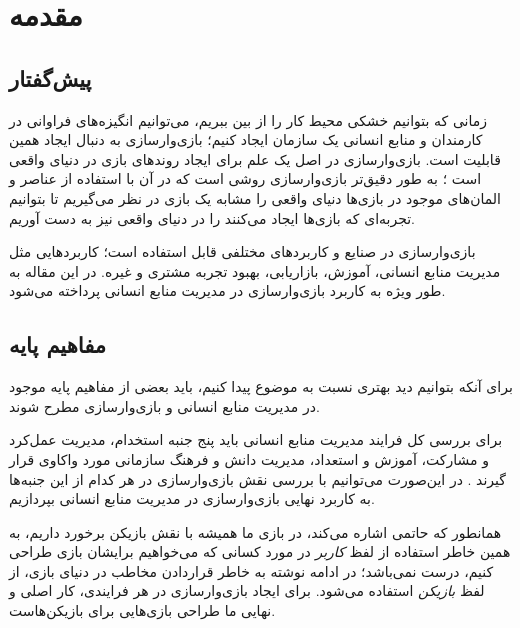 \chapter{مقدمه}
\section{پیش‌گفتار}
زمانی که بتوانیم خشکی محیط کار را از بین ببریم، می‌توانیم انگیزه‌های فراوانی در کارمندان و منابع انسانی یک سازمان ایجاد کنیم؛ بازی‌وارسازی به دنبال ایجاد همین قابلیت است. بازی‌وارسازی در اصل یک علم برای ایجاد روندهای بازی در دنیای واقعی است \cite{boudlaie}؛ به طور دقیق‌تر بازی‌وارسازی روشی است که در آن با استفاده از عناصر و المان‌های موجود در بازی‌ها دنیای واقعی را مشابه یک بازی در نظر می‌گیریم تا بتوانیم تجربه‌ای که بازی‌ها ایجاد می‌کنند را در دنیای واقعی نیز به دست آوریم.

بازی‌وارسازی در صنایع و کاربردهای مختلفی قابل استفاده است؛ کاربردهایی مثل مدیریت منابع انسانی، آموزش، بازاریابی، بهبود تجربه مشتری و غیره. در این مقاله به طور ویژه به کاربرد بازی‌وارسازی در مدیریت منابع انسانی پرداخته می‌شود.
\section{مفاهیم پایه}
برای آنکه بتوانیم دید بهتری نسبت به موضوع پیدا کنیم، باید بعضی از مفاهیم پایه موجود در مدیریت منابع انسانی و بازی‌وارسازی مطرح شوند.

برای بررسی کل فرایند مدیریت منابع انسانی باید پنج جنبه استخدام، مدیریت عمل‌کرد و مشارکت، آموزش و استعداد، مدیریت دانش و فرهنگ سازمانی مورد واکاوی قرار گیرند \cite{amiriamin}. در این‌صورت می‌توانیم با بررسی نقش بازی‌وارسازی در هر کدام از این جنبه‌ها به کاربرد نهایی بازی‌وارسازی در مدیریت منابع انسانی بپردازیم.

همانطور که حاتمی \cite{atoz} اشاره می‌کند، در بازی ما همیشه با نقش بازیکن برخورد داریم، به همین خاطر استفاده از لفظ \emph{کاربر} در مورد کسانی که می‌خواهیم برایشان بازی طراحی کنیم، درست نمی‌باشد؛ در ادامه نوشته به خاطر قراردادن مخاطب در دنیای بازی، از لفظ \emph{بازیکن} استفاده می‌شود. برای ایجاد بازی‌وارسازی در هر فرایندی، کار اصلی و نهایی ما طراحی بازی‌هایی برای بازیکن‌هاست.

